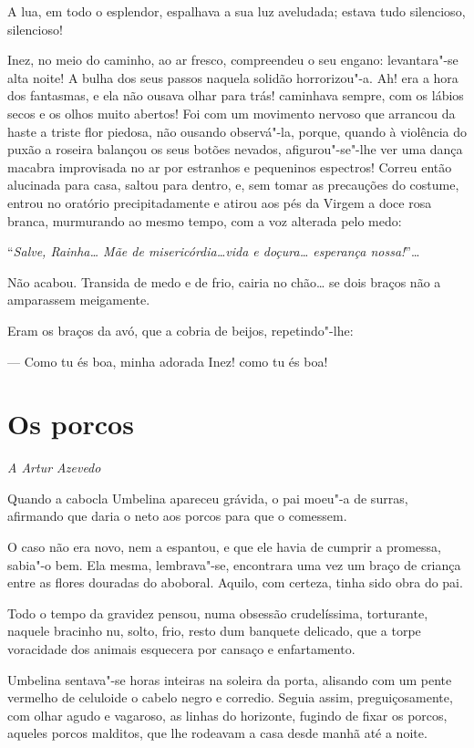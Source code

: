A lua, em todo o esplendor, espalhava a sua luz aveludada; estava tudo
silencioso, silencioso!

Inez, no meio do caminho, ao ar fresco, compreendeu o seu engano:
levantara"-se alta noite! A bulha dos seus passos naquela solidão
horrorizou"-a. Ah! era a hora dos fantasmas, e ela não ousava olhar para
trás! caminhava sempre, com os lábios secos e os olhos muito abertos!
Foi com um movimento nervoso que arrancou da haste a triste flor
piedosa, não ousando observá"-la, porque, quando à violência do puxão a
roseira balançou os seus botões nevados, afigurou"-se"-lhe ver uma dança
macabra improvisada no ar por estranhos e pequeninos espectros! Correu
então alucinada para casa, saltou para dentro, e, sem tomar as
precauções do costume, entrou no oratório precipitadamente e atirou aos
pés da Virgem a doce rosa branca, murmurando ao mesmo tempo, com a voz
alterada pelo medo:

``\emph{Salve, Rainha\ldots{} Mãe de misericórdia\ldots{}vida e doçura\ldots{}
esperança nossa!}''\ldots{}

Não acabou. Transida de medo e de frio, cairia no chão\ldots{} se dois braços
não a amparassem meigamente.

Eram os braços da avó, que a cobria de beijos, repetindo"-lhe:

--- Como tu és boa, minha adorada Inez! como tu és boa!

\chapter{Os porcos}

\hfill{}\emph{A Artur Azevedo}

\bigskip

Quando a cabocla Umbelina apareceu grávida, o pai moeu"-a de surras,
afirmando que daria o neto aos porcos para que o comessem.

O caso não era novo, nem a espantou, e que ele havia de cumprir a
promessa, sabia"-o bem. Ela mesma, lembrava"-se, encontrara uma vez um
braço de criança entre as flores douradas do aboboral. Aquilo, com
certeza, tinha sido obra do pai.

Todo o tempo da gravidez pensou, numa obsessão crudelíssima, torturante,
naquele bracinho nu, solto, frio, resto dum banquete delicado, que a
torpe voracidade dos animais esquecera por cansaço e enfartamento.

Umbelina sentava"-se horas inteiras na soleira da porta, alisando com um
pente vermelho de celuloide o cabelo negro e corredio. Seguia assim,
preguiçosamente, com olhar agudo e vagaroso, as linhas do horizonte,
fugindo de fixar os porcos, aqueles porcos malditos, que lhe rodeavam a
casa desde manhã até a noite.

